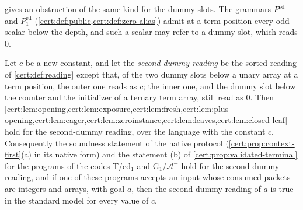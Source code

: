  gives an obstruction of the same kind for the
dummy slots. The grammars $P^{\mathrm{ed}}$ and $P^{\mathrm{ed}}_{1}$
(\cref{cert:def:public,cert:def:zero-alias}) admit at a term position every odd scalar
below the depth, and such a scalar may refer to a dummy slot, which reads $0$.

\begin{proposition}\label{cert:prop:second-dummy}
Let $c$ be a new constant, and let the \emph{second-dummy reading} be the sorted
reading of \cref{cert:def:reading} except that, of the two dummy slots below a unary
array at a term position, the outer one reads as $c$; the inner one, and the dummy
slot below the counter and the initializer of a ternary term array, still read as
$0$. Then \cref{cert:lem:opening,cert:lem:exposure,cert:lem:fresh,cert:lem:plus-opening,cert:lem:eager,cert:lem:zeroinstance,cert:lem:leaves,cert:lem:closed-leaf}
hold for the second-dummy reading, over the language with the constant $c$.
Consequently the soundness statement of the native protocol
(\cref{cert:prop:context-first}(a) in its native form) and the statement (b) of
\cref{cert:prop:validated-terminal} for the programs of the codes T/ed$_1$ and
G$_1$/$\mathcal A^{-}$ hold for the second-dummy reading, and if one of these
programs accepts an input whose consumed packets are integers and arrays, with goal
$a$, then the second-dummy reading of $a$ is true in the standard model for every
value of $c$.
\end{proposition}

